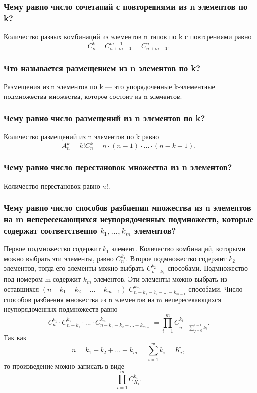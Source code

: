 \documentclass{book}
\begin{document}
\subsubsection*{Чему равно число сочетаний с повторениями из n элементов по k?}

Количество разных комбинаций из элементов n типов по k с повторениями равно $$C_n^k=C_{n+m-1}^{m-1}=C_{n+m-1}^n.$$

\subsubsection*{Что называется размещением из n элементов по k?}

Размещения из n элементов по k --- это упорядоченные k-элементные подмножества множества, которое состоит из n элементов.

\subsubsection*{Чему равно число размещений из n элементов по k?}

Количество размещений из n элементов по k равно $$A_n^k=k!C_n^k=n\cdot(n-1)\cdot...\cdot(n-k+1).$$

\subsubsection*{Чему равно число перестановок множества из n элементов?}

Количество перестановок равно $n!$.

\subsubsection*{Чему равно число способов разбиения множества из n элементов на m непересекающихся неупорядоченных подмножеств, которые содержат соответственно $k_1, ..., k_m$ элементов?}

Первое подмножество содержит $k_1$ элемент. Количество комбинаций, которыми можно выбрать эти элементы, равно $C_n^{k_1}$. Второе подмножество содержит $k_2$ элементов, тогда его элементы можно выбрать $C_{n-k_1}^{k_2}$ способами. Подмножество под номером m содержит $k_m$ элементов. Эти элементы можно выбрать из оставшихся $\left(n-k_1-k_2-...-k_{m-1}\right)$ $C_{n-k_1-k_2-...-k_{m-1}}^{k_m}$ способами. Число способов разбиения множества из n элементов на m непересекающихся неупорядоченных подмножеств равно $$C_n^{k_1}\cdot C_{n-k_1}^{k_2}\cdot...\cdot C_{n-k_1-k_2-...-k_{m-1}}^{k_m}=\prod\limits_{i=1}^mC_{n-\sum\limits_{j=0}^{i-1}k_j}^{k_i}.$$ Так как $$n=k_1+k_2+...+k_m=\sum\limits_{i=1}^m k_i=K_i,$$ то произведение можно записать в виде $$\prod\limits_{i=1}^mC_{K_i}^{k_i}.$$
\end{document}
